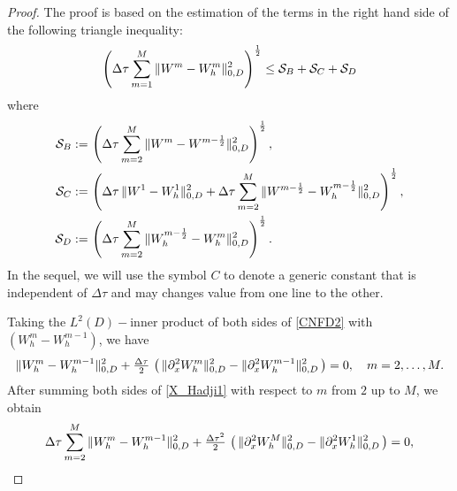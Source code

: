 \documentclass[10pt]{amsart}
\numberwithin{equation}{section}
\begin{document}
\begin{proof}
The proof is based on the estimation of the terms
in the right hand side of the following triangle inequality:
\begin{equation}\label{X_Hadji0}
\left({\Delta\tau}\sum_{m=1}^{{\scriptscriptstyle} M}\|W^m-W_h^m\|_{{\scriptscriptstyle} 0,D}^2\right)^{\frac{1}{2}}\leq
{\mathcal S}_{{\scriptscriptstyle} B}+{\mathcal S}_{{\scriptscriptstyle} C}+{\mathcal S}_{{\scriptscriptstyle} D}
\end{equation}
where
\begin{equation*}
\begin{split}
{\mathcal S}_{{\scriptscriptstyle} B}:=&\,\left({\Delta\tau}\sum_{m=2}^{{\scriptscriptstyle} M}\|W^m-W^{m-{\frac{1}{2}}}\|_{{\scriptscriptstyle} 0,D}^2\right)^{\frac{1}{2}},\\
{\mathcal S}_{{\scriptscriptstyle} C}:=&\,\left({\Delta\tau}\,\|W^1-W_h^1\|_{{\scriptscriptstyle} 0,D}^2
+{\Delta\tau}\sum_{m=2}^{{\scriptscriptstyle} M}\|W^{m-{\frac{1}{2}}}-W_h^{m-{\frac{1}{2}}}\|_{{\scriptscriptstyle} 0,D}^2\right)^{\frac{1}{2}},\\
{\mathcal S}_{{\scriptscriptstyle} D}:=&\,\left({\Delta\tau}\sum_{m=2}^{{\scriptscriptstyle} M}\|W_h^{m-{\frac{1}{2}}}-W_h^m\|_{{\scriptscriptstyle} 0,D}^2\right)^{\frac{1}{2}}.\\
\end{split}
\end{equation*}
In the sequel,  we will use the symbol $C$ to denote a generic constant that is
independent of ${\Delta\tau}$ and may changes value from one line to the other.
\par
Taking the $L^2(D)-$inner product of both sides of \eqref{CNFD2} with $(W_h^m-W_h^{m-1})$,
we have
\begin{equation}\label{X_Hadji1}
\|W_h^m-W_h^{m-1}\|^2_{{\scriptscriptstyle} 0,D}+\tfrac{\Delta\tau}{2}\,\left(\,\|\partial_x^2W_h^m\|_{{\scriptscriptstyle} 0,D}^2
-\|\partial_x^2W_h^{m-1}\|_{{\scriptscriptstyle} 0,D}^2\,\right)=0,\quad m=2,\dots,M.
\end{equation}
After summing both sides of \eqref{X_Hadji1} with respect to $m$ from $2$ up to $M$, we obtain
\begin{equation*}
{\Delta\tau}\sum_{m=2}^{{\scriptscriptstyle} M}\|W_h^m-W_h^{m-1}\|^2_{{\scriptscriptstyle} 0,D}
+\tfrac{{\Delta\tau}^2}{2}\,\left(\,\|\partial_x^2W_h^{{\scriptscriptstyle} M}\|_{{\scriptscriptstyle} 0,D}^2
-\|\partial_x^2W_h^{1}\|_{{\scriptscriptstyle} 0,D}^2\,\right)=0,
\end{equation*}

\end{proof}
\end{document}
